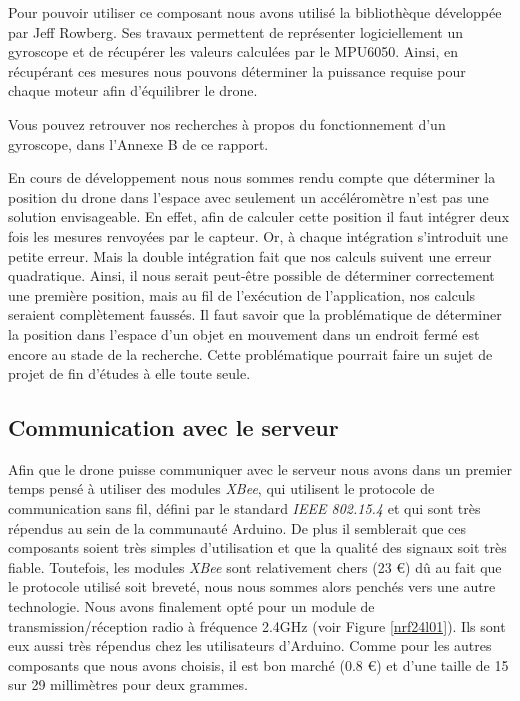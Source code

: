 \documentclass[a4paper,10pt]{report}
\begin{document}
	Pour pouvoir utiliser ce composant nous avons utilisé la bibliothèque 
développée par Jeff Rowberg\cite{jeff_rowberg_lib}. Ses travaux permettent de 
représenter logiciellement un gyroscope et de récupérer les valeurs calculées 
par le MPU6050. Ainsi, en récupérant ces mesures nous pouvons déterminer la 
puissance requise pour chaque moteur afin d'équilibrer le drone.

	Vous pouvez retrouver nos recherches à propos du fonctionnement d'un 
gyroscope, dans l'Annexe B de ce rapport.

	En cours de développement nous nous sommes rendu compte que déterminer 
la position du drone dans l'espace avec seulement un accéléromètre n'est pas 
une solution envisageable. En effet, afin de calculer cette position il faut 
intégrer deux fois les mesures renvoyées par le capteur. Or, à chaque 
intégration s'introduit une petite erreur. Mais la double intégration fait que 
nos calculs suivent une erreur quadratique. Ainsi, il nous serait peut-être 
possible de déterminer correctement une première position, mais au fil de 
l'exécution de l'application, nos calculs seraient complètement faussés. Il 
faut savoir que la problématique de déterminer la position dans l'espace d'un 
objet en mouvement dans un endroit fermé est encore au stade de la recherche. 
Cette problématique pourrait faire un sujet de projet de fin d'études à elle 
toute seule.
      
      \subsection{Communication avec le serveur}
	Afin que le drone puisse communiquer avec le serveur nous avons dans un 
premier temps pensé à utiliser des modules \textit{XBee}, qui utilisent le 
protocole de communication sans fil, défini par le standard \textit{IEEE 
802.15.4} et qui sont très répendus au sein de la communauté Arduino. De plus 
il semblerait que ces composants soient très simples d'utilisation et que la 
qualité des signaux soit très fiable. Toutefois, les modules \textit{XBee} 
sont relativement chers (23 \euro) dû au fait que le protocole utilisé soit 
breveté, nous nous sommes alors penchés vers une autre technologie. Nous avons 
finalement opté pour un module de transmission/réception radio à fréquence 
2.4GHz (voir Figure \ref{nrf24l01}). Ils sont eux aussi très répendus chez les 
utilisateurs d'Arduino. Comme pour les autres composants que nous avons 
choisis, il est bon marché (0.8 \euro) et d'une taille de 15 sur 29 millimètres 
pour deux grammes.
	
\end{document}
